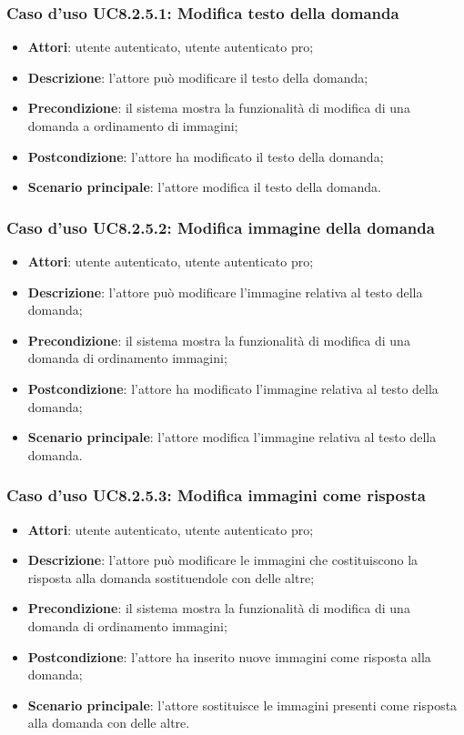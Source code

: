 \subsubsection{Caso d'uso UC8.2.5.1: Modifica testo della domanda}
\begin{itemize}
	\item\textbf{Attori}: utente autenticato, utente autenticato pro;
	\item \textbf{Descrizione}: l'attore può modificare il testo della domanda;
		\item
			\textbf{Precondizione}: il sistema mostra la funzionalità di modifica di una domanda a ordinamento di immagini; 
		\item
			\textbf{Postcondizione}: l'attore ha modificato il testo della domanda;
		\item
			\textbf{Scenario principale}: l'attore modifica il testo della domanda.	
	\end{itemize}

\subsubsection{Caso d'uso UC8.2.5.2: Modifica immagine della domanda}
\begin{itemize}
	\item\textbf{Attori}: utente autenticato, utente autenticato pro;
	\item \textbf{Descrizione}: l'attore può modificare l'immagine relativa al testo della domanda;
		\item
			\textbf{Precondizione}: il sistema mostra la funzionalità di modifica di una domanda di ordinamento immagini; 
		\item
			\textbf{Postcondizione}: l'attore ha modificato l'immagine relativa al testo della domanda;
		\item
			\textbf{Scenario principale}: l'attore modifica l'immagine relativa al testo della domanda. 	
	\end{itemize}

\subsubsection{Caso d'uso UC8.2.5.3: Modifica immagini come risposta}
\begin{itemize}
	\item\textbf{Attori}: utente autenticato, utente autenticato pro;
	\item\textbf{Descrizione}: l'attore può modificare le immagini che costituiscono la risposta alla domanda sostituendole con delle altre;
	\item\textbf{Precondizione}: il sistema mostra la funzionalità di modifica di una domanda di ordinamento immagini;  
	\item \textbf{Postcondizione}: l'attore ha inserito nuove immagini come risposta alla domanda;
	\item\textbf{Scenario principale}: l'attore sostituisce le immagini presenti come risposta alla domanda con delle altre.
\end{itemize}

